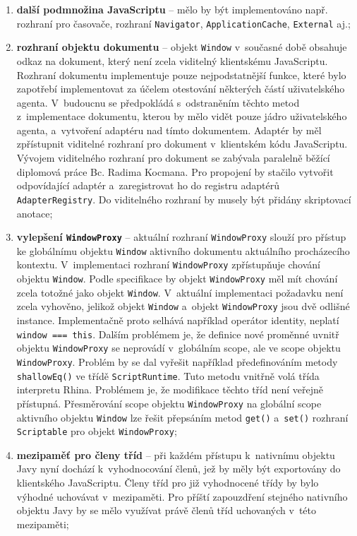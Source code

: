 \begin{enumerate}
  \item \textbf{další podmnožina JavaScriptu} -- mělo by být implementováno např. rozhraní pro časovače, rozhraní \texttt{Navigator}, \texttt{ApplicationCache}, \texttt{External} aj.;
  \item \textbf{rozhraní objektu dokumentu} -- objekt \texttt{Window} v~současné době obsahuje odkaz na dokument, který není zcela viditelný klientskému JavaScriptu. Rozhraní dokumentu implementuje pouze nejpodstatnější funkce, které bylo zapotřebí implementovat za účelem otestování některých částí uživatelského agenta. V~budoucnu se předpokládá s~odstraněním těchto metod z~implementace dokumentu, kterou by mělo vidět pouze jádro uživatelského agenta, a~vytvoření adaptéru nad tímto dokumentem. Adaptér by měl zpřístupnit viditelné rozhraní pro dokument v~klientském kódu JavaScriptu. Vývojem viditelného rozhraní pro dokument se zabývala paralelně běžící diplomová práce Bc. Radima Kocmana. Pro propojení by stačilo vytvořit odpovídající adaptér a~zaregistrovat ho do registru adaptérů \texttt{AdapterRegistry}. Do viditelného rozhraní by musely být přidány skriptovací anotace;
  \item \textbf{vylepšení \texttt{WindowProxy}} -- aktuální rozhraní \texttt{WindowProxy} slouží pro přístup ke globálnímu objektu \texttt{Window} aktivního dokumentu aktuálního procházecího kontextu. V~implementaci rozhraní \texttt{WindowProxy} zpřístupňuje chování objektu \texttt{Window}. Podle specifikace by objekt \texttt{WindowProxy} měl mít chování zcela totožné jako objekt \texttt{Window}. V~aktuální implementaci požadavku není zcela vyhověno, jelikož objekt \texttt{Window} a~objekt \texttt{WindowProxy} jsou dvě odlišné instance. Implementačně proto selhává například operátor identity, neplatí \texttt{window === this}. Dalším problémem je, že definice nové proměnné uvnitř objektu \texttt{WindowProxy} se neprovádí v~globálním scope, ale ve scope  objektu \texttt{WindowProxy}. Problém by se dal vyřešit například předefinováním metody \texttt{shallowEq()} ve třídě \texttt{ScriptRuntime}. Tuto metodu vnitřně volá třída interpretu Rhina. Problémem je, že modifikace těchto tříd není veřejně přístupná. Přesměrování scope  objektu \texttt{WindowProxy} na globální scope aktivního objektu \texttt{Window} lze řešit přepsáním metod \texttt{get()} a~\texttt{set()} rozhraní \texttt{Scriptable} pro objekt \texttt{WindowProxy};
  \item \textbf{mezipaměť pro členy tříd} -- při každém přístupu k~nativnímu objektu Javy nyní dochází k~vyhodnocování členů, jež by měly být exportovány do klientského JavaScriptu. Členy tříd pro již vyhodnocené třídy by bylo výhodné uchovávat v~mezipaměti. Pro příští zapouzdření stejného nativního objektu Javy by se mělo využívat právě členů tříd uchovaných v~této mezipaměti;

\end{enumerate}
